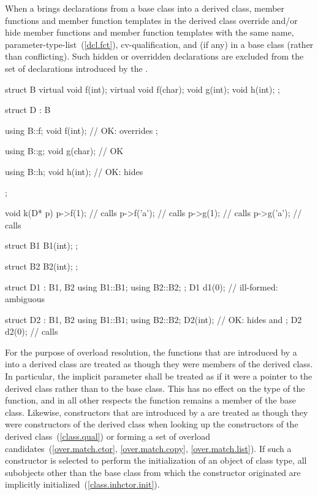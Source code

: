 \pnum
{}%
When a  brings declarations from a base class into
a derived class, member functions and member function templates in
the derived class override and/or hide member functions and member
function templates with the same name,
parameter-type-list~(\ref{dcl.fct}), cv-qualification, and  (if any) in a base
class (rather than conflicting).
Such hidden or overridden declarations are excluded from the set of
declarations introduced by the .
\begin{example}

\begin{codeblock}
struct B {
  virtual void f(int);
  virtual void f(char);
  void g(int);
  void h(int);
};

struct D : B {
  using B::f;
  void f(int);      // OK:  overrides ;

  using B::g;
  void g(char);     // OK

  using B::h;
  void h(int);      // OK:  hides 
};

void k(D* p)
{
  p->f(1);          // calls 
  p->f('a');        // calls 
  p->g(1);          // calls 
  p->g('a');        // calls 
}

struct B1 {
  B1(int);
};

struct B2 {
  B2(int);
};

struct D1 : B1, B2 {
  using B1::B1;
  using B2::B2;
};
D1 d1(0);    // ill-formed: ambiguous

struct D2 : B1, B2 {
  using B1::B1;
  using B2::B2;
  D2(int);   // OK:  hides  and 
};
D2 d2(0);    // calls 
\end{codeblock}
\end{example}

\pnum
{}%
For the purpose of overload resolution, the functions that are
introduced by a  into a derived class
are treated as though they were members of the derived class. In
particular, the implicit  parameter shall be treated as if
it were a pointer to the derived class rather than to the base class.
This has no effect on the type of the function, and in all other
respects the function remains a member of the base class.
Likewise, constructors that are introduced by a 
are treated as though they were constructors of the derived class
when looking up the constructors of the derived class~(\ref{class.qual})
or forming a set of overload candidates~(\ref{over.match.ctor}, \ref{over.match.copy}, \ref{over.match.list}).
If such a constructor is selected to perform the initialization
of an object of class type, all subobjects other than the base class
from which the constructor originated
are implicitly initialized~(\ref{class.inhctor.init}).

